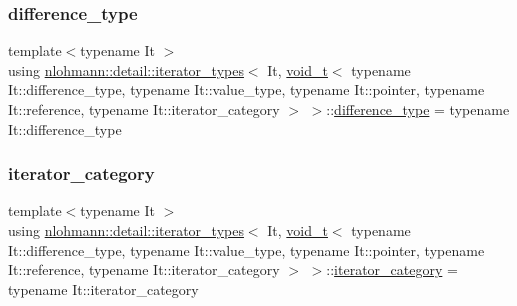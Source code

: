 \subsubsection{\texorpdfstring{difference\+\_\+type}{difference\_type}}
{\footnotesize\ttfamily template$<$typename It $>$ \\
using \hyperlink{structnlohmann_1_1detail_1_1iterator__types}{nlohmann\+::detail\+::iterator\+\_\+types}$<$ It, \hyperlink{namespacenlohmann_1_1detail_a92a167c49c6697b6ffe4f79492c705e5}{void\+\_\+t}$<$ typename It\+::difference\+\_\+type, typename It\+::value\+\_\+type, typename It\+::pointer, typename It\+::reference, typename It\+::iterator\+\_\+category $>$ $>$\+::\hyperlink{structnlohmann_1_1detail_1_1iterator__types_3_01_it_00_01void__t_3_01typename_01_it_1_1differenc4a413e9bd546446175f10f15c5631361_a1ce16c1c8c1d6a195f5a3d3ad31820f0}{difference\+\_\+type} =  typename It\+::difference\+\_\+type}

\mbox{\label{structnlohmann_1_1detail_1_1iterator__types_3_01_it_00_01void__t_3_01typename_01_it_1_1differenc4a413e9bd546446175f10f15c5631361_aaaafbcd0573ec9cfc5d19411950dc1ac}} 
\subsubsection{\texorpdfstring{iterator\+\_\+category}{iterator\_category}}
{\footnotesize\ttfamily template$<$typename It $>$ \\
using \hyperlink{structnlohmann_1_1detail_1_1iterator__types}{nlohmann\+::detail\+::iterator\+\_\+types}$<$ It, \hyperlink{namespacenlohmann_1_1detail_a92a167c49c6697b6ffe4f79492c705e5}{void\+\_\+t}$<$ typename It\+::difference\+\_\+type, typename It\+::value\+\_\+type, typename It\+::pointer, typename It\+::reference, typename It\+::iterator\+\_\+category $>$ $>$\+::\hyperlink{structnlohmann_1_1detail_1_1iterator__types_3_01_it_00_01void__t_3_01typename_01_it_1_1differenc4a413e9bd546446175f10f15c5631361_aaaafbcd0573ec9cfc5d19411950dc1ac}{iterator\+\_\+category} =  typename It\+::iterator\+\_\+category}

